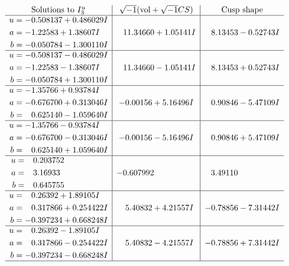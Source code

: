 \documentclass[1p]{elsarticle_modified}
\theoremstyle{definition}
\newcommand{\I}{\sqrt{-1}}
\begin{document}
$$\begin{array}{c|c|c}  
\text{Solutions to }I^u_{3}& \I (\text{vol} + \sqrt{-1}CS) & \text{Cusp shape}\\
 \hline 
\begin{aligned}
u &= -0.508137 + 0.486029 I \\
a &= -1.22583 + 1.38607 I \\
b &= -0.050784 - 1.300110 I\end{aligned}
 & \phantom{-}11.34660 + 1.05141 I & \phantom{-}8.13453 - 0.52743 I \\ \hline\begin{aligned}
u &= -0.508137 - 0.486029 I \\
a &= -1.22583 - 1.38607 I \\
b &= -0.050784 + 1.300110 I\end{aligned}
 & \phantom{-}11.34660 - 1.05141 I & \phantom{-}8.13453 + 0.52743 I \\ \hline\begin{aligned}
u &= -1.35766 + 0.93784 I \\
a &= -0.676700 + 0.313046 I \\
b &= \phantom{-}0.625140 - 1.059640 I\end{aligned}
 & -0.00156 + 5.16496 I & \phantom{-}0.90846 - 5.47109 I \\ \hline\begin{aligned}
u &= -1.35766 - 0.93784 I \\
a &= -0.676700 - 0.313046 I \\
b &= \phantom{-}0.625140 + 1.059640 I\end{aligned}
 & -0.00156 - 5.16496 I & \phantom{-}0.90846 + 5.47109 I \\ \hline\begin{aligned}
u &= \phantom{-}0.203752\phantom{ +0.000000I} \\
a &= \phantom{-}3.16933\phantom{ +0.000000I} \\
b &= \phantom{-}0.645755\phantom{ +0.000000I}\end{aligned}
 & -0.607992\phantom{ +0.000000I} & \phantom{-}3.49110\phantom{ +0.000000I} \\ \hline\begin{aligned}
u &= \phantom{-}0.26392 + 1.89105 I \\
a &= \phantom{-}0.317866 + 0.254422 I \\
b &= -0.397234 + 0.668248 I\end{aligned}
 & \phantom{-}5.40832 + 4.21557 I & -0.78856 - 7.31442 I \\ \hline\begin{aligned}
u &= \phantom{-}0.26392 - 1.89105 I \\
a &= \phantom{-}0.317866 - 0.254422 I \\
b &= -0.397234 - 0.668248 I\end{aligned}
 & \phantom{-}5.40832 - 4.21557 I & -0.78856 + 7.31442 I\\
 \hline 
 \end{array}$$\newpage\newpage\renewcommand{\arraystretch}{1}
\end{document}

